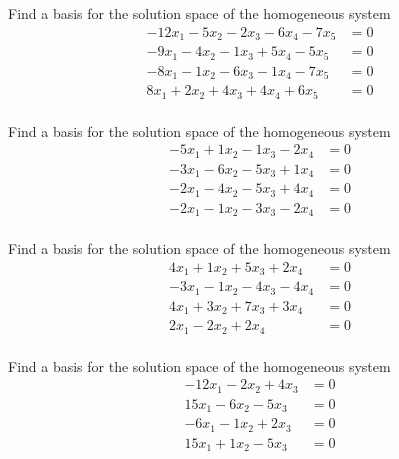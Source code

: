 \documentclass{article}
\begin{document}
\begin{exerciseStatement}
    Find a basis for the solution space of the homogeneous system
\begin{align*}
 -12 x_ 1 -5 x_ 2 -2 x_ 3 -6 x_ 4 -7 x_ 5 &= 0  \\
  -9 x_ 1 -4 x_ 2 -1 x_ 3 + 5 x_ 4 -5 x_ 5 &= 0  \\
  -8 x_ 1 -1 x_ 2 -6 x_ 3 -1 x_ 4 -7 x_ 5 &= 0  \\
  8 x_ 1 + 2 x_ 2 + 4 x_ 3 + 4 x_ 4 + 6 x_ 5 &= 0  \\
 \end{align*}



  
\end{exerciseStatement}

\begin{exerciseStatement}
    Find a basis for the solution space of the homogeneous system
\begin{align*}
 -5 x_ 1 + 1 x_ 2 -1 x_ 3 -2 x_ 4 &= 0  \\
  -3 x_ 1 -6 x_ 2 -5 x_ 3 + 1 x_ 4 &= 0  \\
  -2 x_ 1 -4 x_ 2 -5 x_ 3 + 4 x_ 4 &= 0  \\
  -2 x_ 1 -1 x_ 2 -3 x_ 3 -2 x_ 4 &= 0  \\
 \end{align*}



  
\end{exerciseStatement}

\begin{exerciseStatement}
    Find a basis for the solution space of the homogeneous system
\begin{align*}
 4 x_ 1 + 1 x_ 2 + 5 x_ 3 + 2 x_ 4 &= 0  \\
  -3 x_ 1 -1 x_ 2 -4 x_ 3 -4 x_ 4 &= 0  \\
  4 x_ 1 + 3 x_ 2 + 7 x_ 3 + 3 x_ 4 &= 0  \\
  2 x_ 1 -2 x_ 2 + 2 x_ 4 &= 0  \\
 \end{align*}



  
\end{exerciseStatement}

\begin{exerciseStatement}
    Find a basis for the solution space of the homogeneous system
\begin{align*}
 -12 x_ 1 -2 x_ 2 + 4 x_ 3 &= 0  \\
  15 x_ 1 -6 x_ 2 -5 x_ 3 &= 0  \\
  -6 x_ 1 -1 x_ 2 + 2 x_ 3 &= 0  \\
  15 x_ 1 + 1 x_ 2 -5 x_ 3 &= 0  \\
 \end{align*}



  
\end{exerciseStatement}
\end{document}
